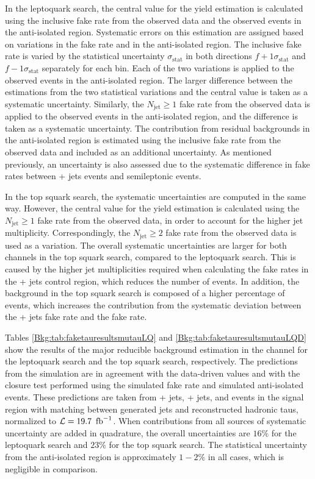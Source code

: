 In the leptoquark search, the central value for the yield estimation is calculated using the inclusive fake rate from the observed data and the observed events in the anti-isolated region. Systematic errors on this estimation are assigned based on variations in the fake rate and in the anti-isolated region. The inclusive fake rate is varied by the statistical uncertainty $\sigma_{\text{stat}}$ in both directions $f+1\sigma_{\text{stat}}$ and $f-1\sigma_{\text{stat}}$ separately for each bin. Each of the two variations is applied to the observed events in the anti-isolated region. The larger difference between the estimations from the two statistical variations and the central value is taken as a systematic uncertainty. Similarly, the $N_{\text{jet}} \geq 1$ fake rate from the observed data is applied to the observed events in the anti-isolated region, and the difference is taken as a systematic uncertainty. The contribution from residual backgrounds in the anti-isolated region is estimated using the inclusive fake rate from the observed data and included as an additional uncertainty. As mentioned previously, an uncertainty is also assessed due to the systematic difference in fake rates between \Zmm + jets events and semileptonic \ttbar events.

In the top squark search, the systematic uncertainties are computed in the same way. However, the central value for the yield estimation is calculated using the $N_{\text{jet}} \geq 1$ fake rate from the observed data, in order to account for the higher jet multiplicity. Correspondingly, the $N_{\text{jet}} \geq 2$ fake rate from the observed data is used as a variation. The overall systematic uncertainties are larger for both channels in the top squark search, compared to the leptoquark search. This is caused by the higher jet multiplicities required when calculating the fake rates in the \Zmm + jets control region, which reduces the number of events. In addition, the background in the top squark search is composed of a higher percentage of \ttbar events, which increases the contribution from the systematic deviation between the \Zmm + jets fake rate and the \ttbar fake rate.

Tables \ref{Bkg:tab:faketauresultsmutauLQ} and \ref{Bkg:tab:faketauresultsmutauLQD} show the results of the major reducible background estimation in the \mutau channel for the leptoquark search and the top squark search, respectively. The predictions from the simulation are in agreement with the data-driven values and with the closure test performed using the simulated fake rate and simulated anti-isolated events. These predictions are taken from \W + jets, \Z + jets, and \ttbar events in the signal region with matching between generated jets and reconstructed hadronic taus, normalized to $\mathcal{L} = 19.7~\mbox{\ensuremath{\,\text{fb}^\text{$-$1}}}$. When contributions from all sources of systematic uncertainty are added in quadrature, the overall uncertainties are $16\%$ for the leptoquark search and $23\%$ for the top squark search. The statistical uncertainty from the anti-isolated region is approximately $1-2\%$ in all cases, which is negligible in comparison.

